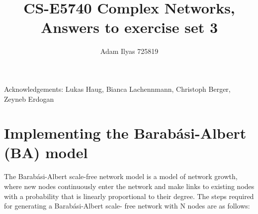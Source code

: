 \documentclass[a4paper,12pt]{article}
\author{Adam Ilyas 725819}
\title{
CS-E5740 Complex Networks, \\
Answers to exercise set 3
}
\begin{document}
\vspace{8pt}

\maketitle

Acknowledgements: Lukas Haug, Bianca Lachennmann, Christoph Berger, Zeyneb Erdogan
\section{Implementing the Barabási-Albert (BA) model}

The Barabási-Albert scale-free network model is a model of network growth, where new nodes
continuously enter the network and make links to existing nodes with a probability that is
linearly proportional to their degree. The steps required for generating a Barabási-Albert scale-
free network with N nodes are as follows:
\end{document}
